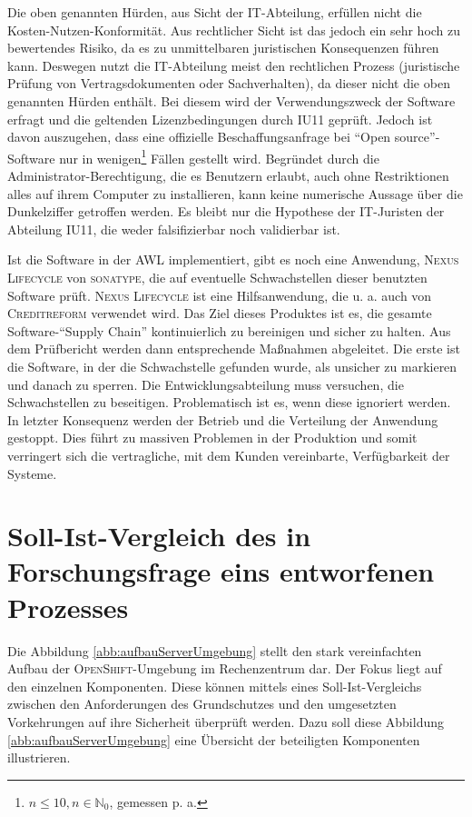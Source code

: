 Die oben genannten Hürden, aus Sicht der IT-Abteilung, erfüllen nicht die Kosten-Nutzen-Konformität. Aus rechtlicher Sicht ist das jedoch ein sehr hoch zu bewertendes Risiko, da es zu unmittelbaren juristischen Konsequenzen führen kann. Deswegen nutzt die IT-Abteilung meist den rechtlichen Prozess (juristische Prüfung von Vertragsdokumenten oder Sachverhalten), da dieser nicht die oben genannten Hürden enthält. Bei diesem wird der Verwendungszweck der Software erfragt und die geltenden Lizenzbedingungen durch \ac{IU11} geprüft. Jedoch ist davon auszugehen, dass eine offizielle Beschaffungsanfrage bei \enquote{Open source}-Software nur in wenigen\footnote{$ n \leq 10, n \in \mathbb{N}_{0} $, gemessen p. a.} Fällen gestellt wird. Begründet durch die Administrator-Berechtigung, die es Benutzern erlaubt, auch ohne Restriktionen alles auf ihrem Computer zu installieren, kann keine numerische Aussage über die Dunkelziffer getroffen werden. Es bleibt nur die Hypothese der IT-Juristen der Abteilung \ac{IU11}, die weder falsifizierbar noch validierbar ist. 
\par
Ist die Software in der \ac{AWL} implementiert, gibt es noch eine Anwendung, \textsc{Nexus Lifecycle} von \textsc{sonatype}, die auf eventuelle Schwachstellen dieser benutzten Software prüft. \textsc{Nexus Lifecycle} ist eine Hilfsanwendung, die u. a. auch von \textsc{Creditreform} verwendet wird. Das Ziel dieses Produktes ist es, die gesamte Software-\enquote{Supply Chain} kontinuierlich zu bereinigen und sicher zu halten.\autocite[vgl.][]{sonatype_inc_nexus_2020} Aus dem Prüfbericht werden dann entsprechende Maßnahmen abgeleitet. Die erste ist die Software, in der die Schwachstelle gefunden wurde, als unsicher zu markieren und danach zu sperren. Die Entwicklungsabteilung muss versuchen, die Schwachstellen zu beseitigen. Problematisch ist es, wenn diese ignoriert werden. In letzter Konsequenz werden der Betrieb und die Verteilung der Anwendung gestoppt. Dies führt zu massiven Problemen in der Produktion und somit verringert sich die vertragliche, mit dem Kunden vereinbarte, Verfügbarkeit der Systeme.

\section{Soll-Ist-Vergleich des in Forschungsfrage eins entworfenen Prozesses}
Die Abbildung \vref{abb:aufbauServerUmgebung} stellt den stark vereinfachten Aufbau der \textsc{OpenShift}-Umgebung im Rechenzentrum dar. Der Fokus liegt auf den einzelnen Komponenten. Diese können mittels eines Soll-Ist-Vergleichs zwischen den Anforderungen des Grundschutzes und den umgesetzten Vorkehrungen auf ihre Sicherheit überprüft werden. Dazu soll diese Abbildung \vref{abb:aufbauServerUmgebung} eine Übersicht der beteiligten Komponenten illustrieren. 

